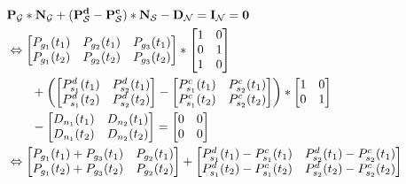 \begin{subequations}
	\begin{align}
		& \vb{P_\mathcal{G}} * \vb{N_\mathcal{G}} + (\vb{P_\mathcal{S}^d} - \vb{P_\mathcal{S}^c}) * \vb{N_\mathcal{S}} - \vb{D_\mathcal{N}} = \vb{I_\mathcal{N}} = \vb{0} \\
		& \Leftrightarrow \begin{bmatrix}
				P_{g_1}(t_1) & P_{g_2}(t_1) & P_{g_3}(t_1) \\
				P_{g_1}(t_2) & P_{g_2}(t_2) & P_{g_3}(t_2)
		\end{bmatrix} * \begin{bmatrix}
			1 & 0 \\
			0 & 1 \\
			1 & 0 \\
		\end{bmatrix} \\
		& \qquad + \left(\begin{bmatrix}
			P_{s_1}^d(t_1) & P_{s_2}^d(t_1) \\
			P_{s_1}^d(t_2) & P_{s_2}^d(t_2)
		\end{bmatrix} - \begin{bmatrix}
			P_{s_1}^c(t_1) & P_{s_2}^c(t_1) \\
			P_{s_1}^c(t_2) & P_{s_2}^c(t_2)
		\end{bmatrix} \right) * \begin{bmatrix}
			1 & 0 \\
			0 & 1 \\
		\end{bmatrix} \nonumber \\
		& \qquad - \begin{bmatrix}
			D_{n_1}(t_1) & D_{n_2}(t_1) \\
			D_{n_1}(t_2) & D_{n_2}(t_2)
		\end{bmatrix} = \begin{bmatrix}
			0 & 0 \\
			0 & 0
		\end{bmatrix} \nonumber \\
		& \Leftrightarrow \begin{bmatrix}
				P_{g_1}(t_1) + P_{g_3}(t_1) & P_{g_2}(t_1) \\
				P_{g_1}(t_2) + P_{g_3}(t_2) & P_{g_2}(t_2)
		\end{bmatrix} + \begin{bmatrix}
			P_{s_1}^d(t_1) - P_{s_1}^c(t_1) & P_{s_2}^d(t_1) - P_{s_2}^c(t_1) \\
			P_{s_1}^d(t_2) - P_{s_1}^c(t_2) & P_{s_2}^d(t_2) - P_{s_2}^c(t_2)

\end{bmatrix}
\end{align}
\end{subequations}
